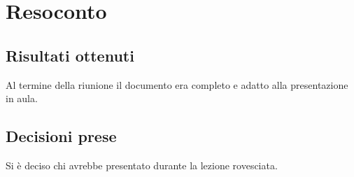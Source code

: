 \section{Resoconto}

\subsection{Risultati ottenuti}
Al termine della riunione il documento era completo e adatto alla presentazione in aula.

\subsection{Decisioni prese}
Si è deciso chi avrebbe presentato durante la lezione rovesciata.